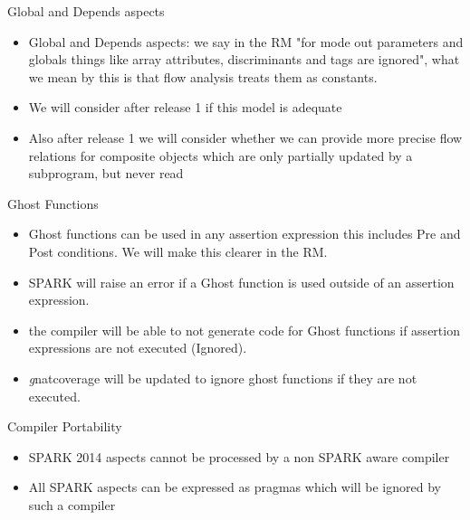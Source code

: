 \documentclass{beamer}
\begin{document}
\begin{frame}{Global and Depends aspects}

  \begin{itemize}

  \item Global and Depends aspects: we say in the RM "for mode out
    parameters and globals things like array attributes,
    discriminants and tags are ignored", what we mean by this is
    that flow analysis treats them as constants.
  \item We will consider after release 1 if this model is adequate
  \item Also after release 1 we will consider whether we can provide more
  precise flow relations for composite objects which are only
  partially updated by a subprogram, but never read
  \end{itemize}

\end{frame}

\begin{frame}{Ghost Functions}

  \begin{itemize}

  \item Ghost functions can be used in any assertion expression this
    includes Pre and Post conditions.  We will make this clearer in the
    RM.
  \item SPARK will raise an error if a Ghost
    function is used outside of an assertion expression.  
  \item the compiler will be able to not generate
    code for Ghost functions if assertion expressions are not executed
    (Ignored).
  \item \emph gnatcoverage will be updated to ignore ghost functions if
    they are not executed.
 \end{itemize}

\end{frame}

\begin{frame}{Compiler Portability}

  \begin{itemize}

  \item SPARK 2014 aspects cannot be processed by a non SPARK aware compiler  
  \item All SPARK aspects can be expressed as pragmas which will be
    ignored by such a compiler
 \end{itemize}

\end{frame}
\end{document}
